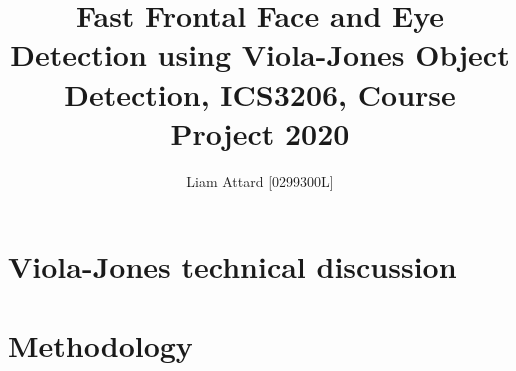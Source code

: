 \documentclass[12pt,conference]{IEEEtran}
\title{Fast Frontal Face and Eye Detection using Viola-Jones Object	Detection, ICS3206, Course Project 2020}
\author{Liam Attard [0299300L]}
\date{}
\begin{document}
    \maketitle

    \section{Viola-Jones technical discussion}
        

    \section{Methodology}

                


            
             
\end{document}
